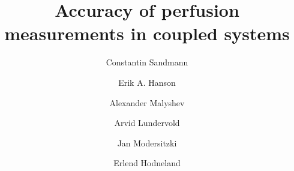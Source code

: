 \documentclass[final,5p,times,twocolumn]{elsarticle}
\begin{document}
\begin{frontmatter}



\title{Accuracy of perfusion measurements in coupled systems}


\author[1]{Constantin Sandmann}
\author[2]{Erik A. Hanson}
\author[2]{Alexander Malyshev}
\author[3,4]{Arvid Lundervold}
\author[1]{Jan Modersitzki}
\author[5,6]{Erlend Hodneland}

\address[1]{Institute of Mathematics and Image Computing, University of L\"ubeck, Germany}
\address[2]{Department of Mathematics, University of Bergen, Norway}
\address[3]{Department of Biomedicine, University of Bergen, Norway}
\address[4]{Department of Radiology, Haukeland University Hospital, Norway}
\address[5]{Christian Michelsen Research, Bergen, Norway}
\address[6]{MedViz Research Cluster, University of Bergen, Norway}






\end{frontmatter}
\end{document}
